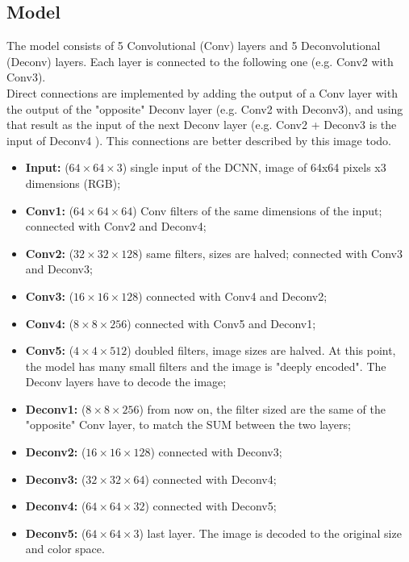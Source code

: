 \documentclass[twocolumn,showpacs,%
  nofootinbib,aps,superscriptaddress,%
  eqsecnum,prd,notitlepage,showkeys,10pt]{revtex4-1}
\begin{document}

\subsection{Model}
The model consists of 5 Convolutional (Conv) layers and 5 Deconvolutional (Deconv) layers. Each layer is connected to the following one (e.g. Conv2 with Conv3).\\
Direct connections are implemented by adding the output of a Conv layer with the output of the "opposite" Deconv layer (e.g. Conv2 with Deconv3), and using that result as the input of the next Deconv layer (e.g. Conv2 + Deconv3 is the input of Deconv4 ). This connections are better described by this image todo. 
\begin{itemize}
    \item \textbf{Input:} ($64\times64\times3$) single input of the DCNN, image of 64x64 pixels x3 dimensions (RGB);
    \item \textbf{Conv1:} ($64\times64\times64$) Conv filters of the same dimensions of the input; connected with Conv2 and Deconv4;
    \item \textbf{Conv2:} ($32\times32\times128$) same filters, sizes are halved; connected with Conv3 and Deconv3;
    \item \textbf{Conv3:} ($16\times16\times128$) connected with Conv4 and Deconv2;
    \item \textbf{Conv4:} ($8\times8\times256$) connected with Conv5 and Deconv1;
    \item \textbf{Conv5:} ($4\times4\times512$) doubled filters, image sizes are halved. At this point, the model has many small filters and the image is "deeply encoded". The Deconv layers have to decode the image;
    \item \textbf{Deconv1:} ($8\times8\times256$) from now on, the filter sized are the same of the "opposite" Conv layer, to match the SUM between the two layers;
    \item \textbf{Deconv2:} ($16\times16\times128$) connected with Deconv3;
    \item \textbf{Deconv3:} ($32\times32\times64$) connected with Deconv4;
    \item \textbf{Deconv4:} ($64\times64\times32$) connected with Deconv5;
    \item \textbf{Deconv5:} ($64\times64\times3$) last layer. The image is decoded to the original size and color space.
\end{itemize}
\end{document}
